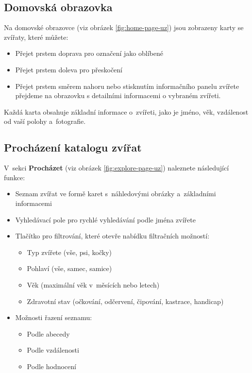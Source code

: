 \documentclass[czech, bp, kiv, he, iso690numb, pdf]{fasthesis}
\begin{document}
    \subsection*{Domovská obrazovka}

    Na domovské obrazovce (viz obrázek \ref{fig:home-page-uz}) jsou zobrazeny karty se zvířaty, které můžete:

    \begin{itemize}
        \item Přejet prstem doprava pro označení jako oblíbené
        \item Přejet prstem doleva pro přeskočení
        \item Přejet prstem směrem nahoru nebo stisknutím informačního panelu zvířete přejdeme na obrazovku s detailními informacemi o vybraném zvířeti.
    \end{itemize}

    Každá karta obsahuje základní informace o~zvířeti, jako je jméno, věk, vzdálenost od vaší polohy a~fotografie.

    \subsection*{Procházení katalogu zvířat}

    V~sekci \textbf{Procházet} (viz obrázek \ref{fig:explore-page-uz}) naleznete následující funkce:

    \begin{itemize}
        \item Seznam zvířat ve formě karet s~náhledovými obrázky a~základními informacemi
        \item Vyhledávací pole pro rychlé vyhledávání podle jména zvířete
        \item Tlačítko pro filtrování, které otevře nabídku filtračních možností:
        \begin{itemize}
            \item Typ zvířete (vše, psi, kočky)
            \item Pohlaví (vše, samec, samice)
            \item Věk (maximální věk v~měsících nebo letech)
            \item Zdravotní stav (očkování, odčervení, čipování, kastrace, handicap)
        \end{itemize}
        \item Možnosti řazení seznamu:
        \begin{itemize}
            \item Podle abecedy
            \item Podle vzdálenosti
            \item Podle hodnocení
        \end{itemize}
    \end{itemize}
\end{document}
